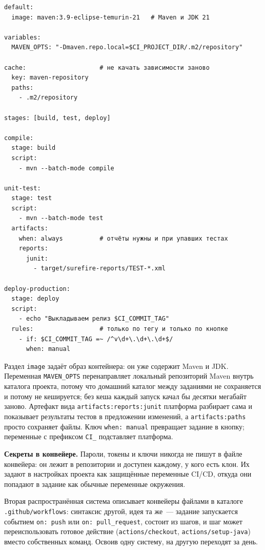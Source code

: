 \begin{listing}[H]
\begin{verbatim}
default:
  image: maven:3.9-eclipse-temurin-21   # Maven и JDK 21

variables:
  MAVEN_OPTS: "-Dmaven.repo.local=$CI_PROJECT_DIR/.m2/repository"

cache:                    # не качать зависимости заново
  key: maven-repository
  paths:
    - .m2/repository

stages: [build, test, deploy]

compile:
  stage: build
  script:
    - mvn --batch-mode compile

unit-test:
  stage: test
  script:
    - mvn --batch-mode test
  artifacts:
    when: always          # отчёты нужны и при упавших тестах
    reports:
      junit:
        - target/surefire-reports/TEST-*.xml

deploy-production:
  stage: deploy
  script:
    - echo "Выкладываем релиз $CI_COMMIT_TAG"
  rules:                  # только по тегу и только по кнопке
    - if: $CI_COMMIT_TAG =~ /^v\d+\.\d+\.\d+$/
      when: manual
\end{verbatim}
\caption{Конвейер сборки, тестирования и выкладки}
\label{lst:12-13}
\end{listing}

Раздел \texttt{image} задаёт образ контейнера: он уже содержит Maven и JDK. Переменная \texttt{MAVEN\_OPTS} перенаправляет локальный репозиторий Maven внутрь каталога проекта, потому что домашний каталог между заданиями не сохраняется и потому не кешируется; без кеша каждый запуск качал бы десятки мегабайт заново. Артефакт вида \texttt{artifacts:reports:junit} платформа разбирает сама и показывает результаты тестов в предложении изменений, а \texttt{artifacts:paths} просто сохраняет файлы. Ключ \texttt{when: manual} превращает задание в кнопку; переменные с префиксом \texttt{CI\_} подставляет платформа.

\begin{vrezka}
\textbf{Секреты в конвейере.} Пароли, токены и ключи никогда не пишут в файле конвейера: он лежит в репозитории и доступен каждому, у кого есть клон. Их задают в настройках проекта как защищённые переменные CI/CD, откуда они попадают в задание как обычные переменные окружения.
\end{vrezka}

Вторая распространённая система описывает конвейеры файлами в каталоге \texttt{.github/workflows}: синтаксис другой, идея та же~--- задание запускается событием \texttt{on: push} или \texttt{on: pull\_request}, состоит из шагов, и шаг может переиспользовать готовое действие (\texttt{actions/checkout}, \texttt{actions/setup-java}) вместо собственных команд. Освоив одну систему, на другую переходят за день.

